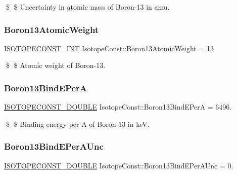 \$ \$ Uncertainty in atomic mass of Boron-\/13 in amu. \mbox{\label{group___isotope_const-_boron-_b13_ga3c0aebde12556a0dc8f79063ac779b00}} 
\subsubsection{\texorpdfstring{Boron13\+Atomic\+Weight}{Boron13AtomicWeight}}
{\footnotesize\ttfamily \mbox{\hyperlink{group___isotope_const-_macros_ga5f18360b3e99483a35c32d789e62621c}{I\+S\+O\+T\+O\+P\+E\+C\+O\+N\+S\+T\+\_\+\+I\+NT}} Isotope\+Const\+::\+Boron13\+Atomic\+Weight = 13}

\$ \$ Atomic weight of Boron-\/13. \mbox{\label{group___isotope_const-_boron-_b13_ga98897413abae02d8449a367c334d9f47}} 
\subsubsection{\texorpdfstring{Boron13\+Bind\+E\+PerA}{Boron13BindEPerA}}
{\footnotesize\ttfamily \mbox{\hyperlink{group___isotope_const-_macros_ga8f45a7272ce02c0b4c65c44636ed719a}{I\+S\+O\+T\+O\+P\+E\+C\+O\+N\+S\+T\+\_\+\+D\+O\+U\+B\+LE}} Isotope\+Const\+::\+Boron13\+Bind\+E\+PerA = 6496.}

\$ \$ Binding energy per A of Boron-\/13 in keV. \mbox{\label{group___isotope_const-_boron-_b13_ga678c36464256149871e3279f53a5a371}} 
\subsubsection{\texorpdfstring{Boron13\+Bind\+E\+Per\+A\+Unc}{Boron13BindEPerAUnc}}
{\footnotesize\ttfamily \mbox{\hyperlink{group___isotope_const-_macros_ga8f45a7272ce02c0b4c65c44636ed719a}{I\+S\+O\+T\+O\+P\+E\+C\+O\+N\+S\+T\+\_\+\+D\+O\+U\+B\+LE}} Isotope\+Const\+::\+Boron13\+Bind\+E\+Per\+A\+Unc = 0.}

